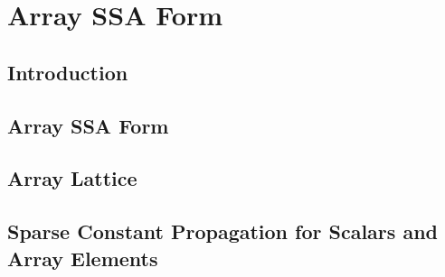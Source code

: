 \chapter{Array SSA Form }
\graphicspath{{part2/array_ssa/Figs/}{array_ssa/Figs/}{Figs/}}


\section{Introduction}
\label{sec:intro}

\section{Array SSA Form}
\label{sec:arrayssa}

\section{Array Lattice}
\label{sec:arraylattice}

\section{Sparse Constant Propagation for Scalars and Array Elements}
\label{sec:sc}

